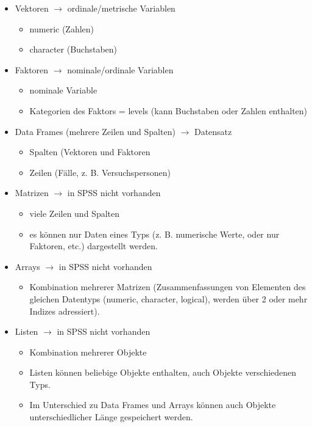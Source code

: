 \documentclass[]{article}
\providecommand{\tightlist}{%
  \setlength{\itemsep}{0pt}\setlength{\parskip}{0pt}}
\begin{document}
\begin{itemize}
\tightlist
\item
  Vektoren \(\rightarrow\) ordinale/metrische Variablen

  \begin{itemize}
  \tightlist
  \item
    numeric (Zahlen)
  \item
    character (Buchstaben)
  \end{itemize}
\item
  Faktoren \(\rightarrow\) nominale/ordinale Variablen

  \begin{itemize}
  \tightlist
  \item
    nominale Variable
  \item
    Kategorien des Faktors = levels (kann Buchstaben oder Zahlen
    enthalten)
  \end{itemize}
\item
  Data Frames (mehrere Zeilen und Spalten) \(\rightarrow\) Datensatz

  \begin{itemize}
  \tightlist
  \item
    Spalten (Vektoren und Faktoren
  \item
    Zeilen (Fälle, z. B. Versuchspersonen)
  \end{itemize}
\item
  Matrizen \(\rightarrow\) in SPSS nicht vorhanden

  \begin{itemize}
  \tightlist
  \item
    viele Zeilen und Spalten
  \item
    es können nur Daten eines Typs (z. B. numerische Werte, oder nur
    Faktoren, etc.) dargestellt werden.
  \end{itemize}
\item
  Arrays \(\rightarrow\) in SPSS nicht vorhanden

  \begin{itemize}
  \tightlist
  \item
    Kombination mehrerer Matrizen (Zusammenfassungen von Elementen des
    gleichen Datentyps (numeric, character, logical), werden über 2 oder
    mehr Indizes adressiert).
  \end{itemize}
\item
  Listen \(\rightarrow\) in SPSS nicht vorhanden

  \begin{itemize}
  \tightlist
  \item
    Kombination mehrerer Objekte
  \item
    Listen können beliebige Objekte enthalten, auch Objekte
    verschiedenen Typs.
  \item
    Im Unterschied zu Data Frames und Arrays können auch Objekte
    unterschiedlicher Länge gespeichert werden.
  \end{itemize}
\end{itemize}
\end{document}
